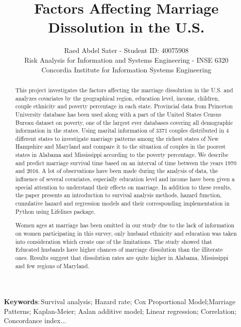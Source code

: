 \documentclass[10pt,twocolumn]{article}
\title{\Large\textbf{Factors Affecting Marriage Dissolution in the U.S.}}
\author{Raed Abdel Sater - Student ID: 40075908\\
 Risk Analysis for Information and Systems Engineering - INSE 6320\\
Concordia Institute for Information Systems Engineering
}
\date{}
\begin{document}
\maketitle
\begin{abstract}
This project investigates the factors affecting the marriage dissolution in the U.S. and analyzes covariates by the geographical region, education level, income, children, couple ethnicity and poverty percentage in each state. Provincial data from Princeton University  database\cite{Princeton2017University} has been used along with a part of the United States Census Bureau dataset on poverty, one of the largest ever databases covering all demographic information in the states\cite{Census2018Bureau}. Using marital information of 3371 couples distributed in 4 different states to investigate marriage patterns among the richest states of New Hampshire and Maryland and compare it to the situation of couples in the poorest states in Alabama and Mississippi according to the poverty percentage. We describe and predict marriage survival time based on an interval of time between the years 1970 and 2016. A lot of observations have been made during the analysis of data, the influence of several covariates, especially education level and income have been given a special attention to understand their effects on marriage. In addition to these results, the paper presents an introduction to survival analysis methods, hazard function, cumulative hazard and regression models and their corresponding implementation in Python using Lifelines package. 

Women ages at marriage has been omitted in our study due to the lack of information on women participating in this survey, only husband ethnicity and education was taken into consideration which create one of the limitations. The study showed that Educated husbands have higher chances of marriage dissolution than the illiterate ones. Results suggest that dissolution rates are quite higher in Alabama, Mississippi and few regions of Maryland.
\end{abstract}

\bigskip
\noindent\textbf{Keywords}:\,Survival analysis; Hazard rate; Cox Proportional Model;Marriage Patterns; Kaplan-Meier; Aalan additive model; Linear regression; Correlation; Concordance index...
\end{document}
